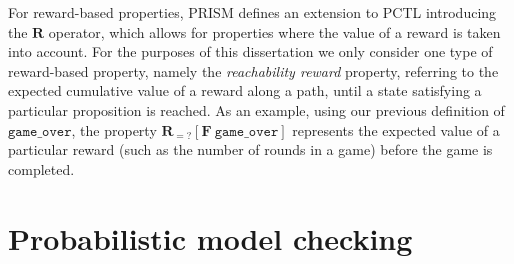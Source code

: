 For reward-based properties, PRISM defines an extension to PCTL introducing the $\mathbf{R}$ operator, which allows for properties where the value of a reward is taken into account. For the purposes of this dissertation we only consider one type of reward-based property, namely the \emph{reachability reward} property, referring to the expected cumulative value of a reward along a path, until a state satisfying a particular proposition is reached. As an example, using our previous definition of $\mathtt{game\_over}$, the property $\mathbf{R}_{=?} [\mathbf{F}\ \mathtt{game\_over}]$ represents the expected value of a particular reward (such as the number of rounds in a game) before the game is completed.

\section{Probabilistic model checking}
\label{back:prob_mod_check}





